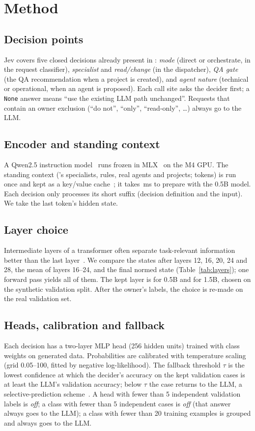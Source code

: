 \section{Method}\label{sec:method}
\subsection{Decision points}
Jev covers five closed decisions already present in \sys{}: \emph{mode} (direct or orchestrate, in the request classifier), \emph{specialist} and \emph{read/change} (in the dispatcher), \emph{QA gate} (the QA recommendation when a project is created), and \emph{agent nature} (technical or operational, when an agent is proposed). Each call site asks the decider first; a \texttt{None} answer means ``use the existing LLM path unchanged''. Requests that contain an owner exclusion (``do not'', ``only'', ``read-only'', \ldots) always go to the LLM.
\subsection{Encoder and standing context}
A Qwen2.5 instruction model~\cite{qwen25} runs frozen in MLX~\cite{mlx} on the M4 GPU. The standing context (\sys{}'s specialists, rules, real agents and projects; \prefixTokens{} tokens) is run once and kept as a key/value cache~\cite{pope2023}; it takes \prefixMsFive{}\,ms to prepare with the 0.5B model. Each decision only processes its short suffix (decision definition and the input). We take the last token's hidden state.
\subsection{Layer choice}
Intermediate layers of a transformer often separate task-relevant information better than the last layer~\cite{alain2017,belrose2023}. We compare the states after layers 12, 16, 20, 24 and 28, the mean of layers 16--24, and the final normed state (Table~\ref{tab:layers}); one forward pass yields all of them. The kept layer is \layerFive{} for 0.5B and \layerFifteen{} for 1.5B, chosen on the synthetic validation split. \prov{} After the owner's labels, the choice is re-made on the real validation set.
\subsection{Heads, calibration and fallback}
Each decision has a two-layer MLP head (256 hidden units) trained with class weights on generated data. Probabilities are calibrated with temperature scaling~\cite{guo2017} (grid 0.05--100, fitted by negative log-likelihood). The fallback threshold $\tau$ is the lowest confidence at which the decider's accuracy on the kept validation cases is at least the LLM's validation accuracy; below $\tau$ the case returns to the LLM, a selective-prediction scheme~\cite{geifman2017}. A head with fewer than 5 independent validation labels is \emph{off}; a class with fewer than 5 independent cases is \emph{off} (that answer always goes to the LLM); a class with fewer than 20 training examples is grouped and always goes to the LLM.
